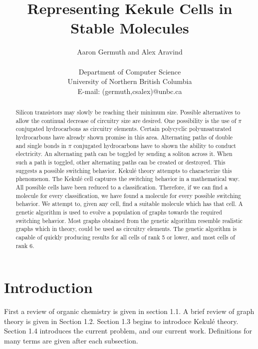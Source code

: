 \documentclass[12pt]{article}
\begin{document}
\title{Representing Kekule Cells in Stable Molecules}
\author{Aaron Germuth and Alex Aravind \\\\  
Department of Computer Science \\
University of Northern British Columbia \\
E-mail: (germuth,csalex)@unbc.ca}
\maketitle


\begin{abstract}

Silicon transistors may slowly be reaching their minimum size. Possible alternatives to allow the continual decrease of circuitry size are desired. One possibility is the use of $\pi$ conjugated hydrocarbons as circuitry elements.  Certain polycyclic polyunsaturated hydrocarbons have already shown promise in this area. Alternating paths of double and single bonds in $\pi$ conjugated hydrocarbons have to shown the ability to conduct electricity. An alternating path can be toggled by sending a soliton across it. When such a path is toggled, other alternating paths can be created or destroyed. This suggests a possible switching behavior. Kekul\'e theory attempts to characterize this phenomenon. The Kekul\'e cell captures the switching behavior in a mathematical way. All possible cells have been reduced to a classification. Therefore, if we can find a molecule for every classification, we have found a molecule for every possible switching behavior. We attempt to, given any cell, find a suitable molecule which has that cell. A genetic algorithm is used to evolve a population of graphs towards the required switching behavior. Most graphs obtained from the genetic algorithm resemble realistic graphs which in theory, could be used as circuitry elements. The genetic algorithm is capable of quickly producing results for all cells of rank 5 or lower, and most cells of rank 6.

\end{abstract}

\section{Introduction}

First a review of organic chemistry is given in section 1.1. A brief review of graph theory is given in Section 1.2. Section 1.3 begins to introdoce Kekul\'e theory. Section 1.4 introduces the current problem, and our current work. Definitions for many terms are given after each subsection.
\end{document}
